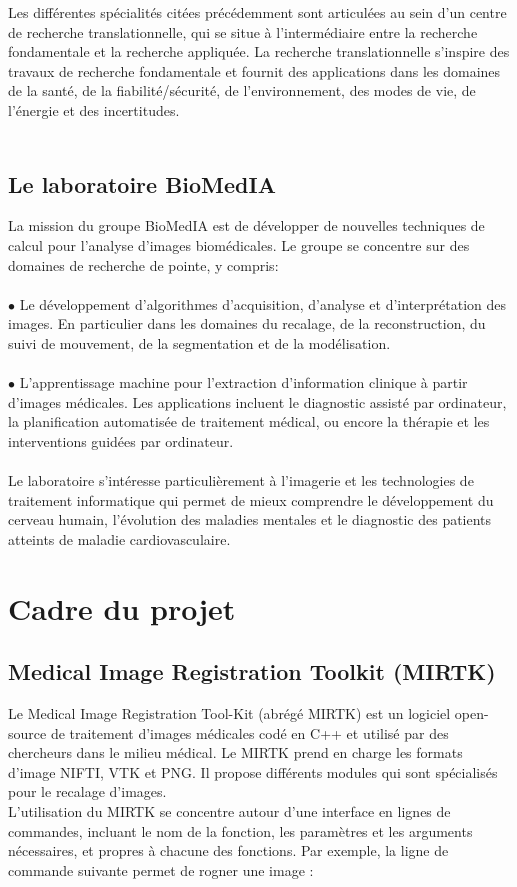 \documentclass[10pt]{report}
\begin{document}
	Les différentes spécialités citées précédemment sont articulées au sein d'un centre de recherche translationnelle, qui se situe à l'intermédiaire entre la recherche fondamentale et la recherche appliquée. La recherche translationnelle s'inspire des travaux de recherche fondamentale et fournit des applications dans les domaines de la santé, de la fiabilité/sécurité, de l'environnement, des modes de vie, de l'énergie et des incertitudes.
	\\
	\\
	\subsection{Le laboratoire BioMedIA}

	La mission du groupe BioMedIA est de développer de nouvelles techniques de
	calcul pour l'analyse d'images biomédicales. Le groupe se concentre sur des
	domaines de recherche de pointe, y compris:\\
	\\{$\bullet$} Le développement d'algorithmes d'acquisition, d'analyse et d'interprétation des images. En particulier dans les domaines du recalage, de la reconstruction,
	du suivi de mouvement, de la segmentation et de la modélisation. \\
	\\{$\bullet$} L'apprentissage machine pour l'extraction d'information clinique à partir
	d'images médicales. Les applications incluent le diagnostic assisté par
	ordinateur, la planification automatisée de traitement médical, ou encore la thérapie et les interventions guidées par ordinateur. \\
	\\Le laboratoire s'intéresse particulièrement à l'imagerie et les technologies de
	traitement informatique qui permet de mieux comprendre le
	développement du cerveau humain, l’évolution des maladies mentales et le
	diagnostic des patients atteints de maladie cardiovasculaire.
	
	\section{Cadre du projet} 
	\subsection{Medical Image Registration Toolkit (MIRTK)}
	Le Medical Image Registration Tool-Kit (abrégé MIRTK) est un logiciel open-source de traitement d'images médicales codé en C++ et utilisé par des chercheurs dans le milieu médical. Le MIRTK prend en charge les formats d'image NIFTI, VTK et PNG. Il propose différents modules qui sont spécialisés pour le recalage d'images. \\ 
	L'utilisation du MIRTK se concentre autour d'une interface en lignes de commandes, incluant le nom de la fonction, les paramètres et les arguments nécessaires, et propres à chacune des fonctions. Par exemple, la ligne de commande suivante permet de rogner une image :
	
\end{document}
